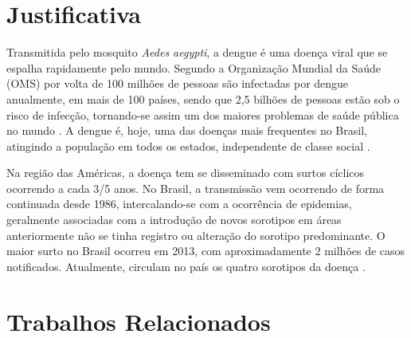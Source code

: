 \documentclass[
	12pt,				%
	openright,			%
	oneside,	
	a4paper,				%
	english,				%
	brazil				%
]{abntex2/abntex2} %
\begin{document}
	\section{Justificativa}
	

	Transmitida pelo mosquito \textit{Aedes aegypti}, a dengue é uma doença viral que se espalha rapidamente pelo mundo. Segundo a Organização Mundial da Saúde (OMS) por volta de 100 milhões de pessoas são infectadas por dengue anualmente, em mais de 100 países, sendo que 2,5 bilhões de pessoas estão sob o risco de infecção, tornando-se assim um dos maiores problemas de saúde pública no mundo \cite{bhatt:2013}. A dengue é, hoje, uma das doenças mais frequentes no Brasil, atingindo a população em todos os estados, independente de classe social \cite{saude:2008}.
	
	Na região das Américas, a doença tem se disseminado com surtos cíclicos ocorrendo a cada 3/5 anos. No Brasil, a transmissão vem ocorrendo de forma continuada desde 1986, intercalando-se com a ocorrência de epidemias, geralmente associadas com a introdução de novos sorotipos em áreas anteriormente não se tinha registro ou alteração do sorotipo predominante. O maior surto no Brasil ocorreu em 2013, com aproximadamente 2 milhões de casos notificados. Atualmente, circulam no país os quatro sorotipos da doença \cite{MS:2015}.
	

	
	\section{Trabalhos Relacionados}	
	
\end{document}
